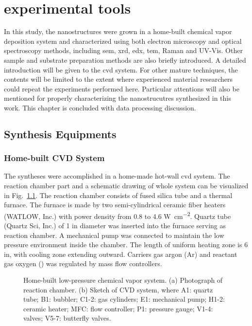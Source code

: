 
\chapter{experimental tools}

In this study, the nanostructures were grown in a home-built chemical vapor deposition system and characterized using both electron microscopy and optical spectroscopy methods, including \gls{sem}, \gls{xrd}, \gls{edx}, \gls{tem}, Raman and UV-Vis. Other sample and substrate preparation methods are also briefly introduced. A detailed introduction will be given to the \gls{cvd} system. For other mature techniques, the contents will be limited to the extent where experienced material researchers could repeat the experiments performed here. Particular attentions will also be mentioned for properly characterizing the nanostrucutres synthesized in this work. This chapter is concluded with data processing discussion. 

\section{Synthesis Equipments}
\subsection{Home-built CVD System}
The syntheses were accomplished in a home-made hot-wall \gls{cvd} system. The reaction chamber part and a schematic drawing of whole system can be visualized in Fig.~\ref{fig:ch2cvd}.  The reaction chamber consists of fused silica tube and a thermal furnace. The furnace is made by two semi-cylindrical ceramic fiber heaters (WATLOW, Inc.) with power density from 0.8 to 4.6 \si{W cm^{-2}}. Quartz tube (Quartz Sci, Inc.) of 1 in diameter was inserted into the furnace serving as reaction chamber. A mechanical pump was connected to maintain the low pressure environment inside the chamber. The length of uniform heating zone is 6 in, with cooling zone extending outward. Carriers gas argon (Ar) and reactant gas oxygen () was regulated by mass flow controllers.

\begin{figure}[htb]
\centering
{}

\caption[CVD system]{Home-built low-pressure chemical vapor system. (a) Photograph of reaction chamber. (b) Sketch of CVD system, where A1: quartz tube; B1: bubbler; C1-2: gas cylinders; E1: mechanical pump; H1-2: ceramic heater; MFC: flow controller; P1: pressure gauge; V1-4: valves; V5-7: butterfly valves.}
\label{fig:ch2cvd}
\end{figure}

